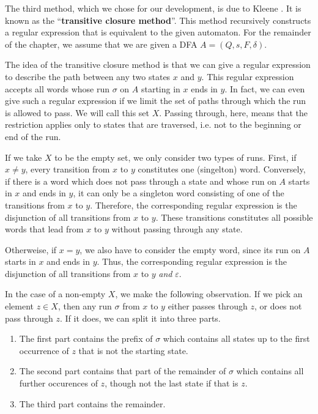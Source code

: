 The third method, which we chose for our development, is due to Kleene \cite{KleeneNets}.
It is known as the ``\textbf{transitive closure method}''.
This method recursively constructs a regular expression that is equivalent to the given automaton.
For the remainder of the chapter, we assume that we are given a DFA $A=(Q,s,F,\delta)$.


The idea of the transitive closure method is that we can give a regular expression to describe the path between any two states $x$ and $y$.
This regular expression accepts all words whose run $\sigma$ on $A$ starting in $x$ ends in $y$.
In fact, we can even give such a regular expression if we limit the set of paths through which the run is allowed to pass. 
We will call this set $X$.
Passing through, here, means that the restriction applies only to states that are traversed, 
i.e. not to the beginning or end of the run.


If we take $X$ to be the empty set, we only consider two types of runs.
First, if $x \neq y$, every transition from $x$ to $y$ constitutes one (singelton) word. 
Conversely, if there is a word which does not pass through a state and whose run on $A$ starts in $x$ and ends in $y$, 
it can only be a singleton word consisting of one of the transitions from $x$ to $y$.
Therefore, the corresponding regular expression is the disjunction of all transitions from $x$ to $y$. 
These transitions constitutes all possible words that lead from $x$ to $y$ without passing through any state.

Otherweise, if $x = y$, we also have to consider the empty word, since its run on $A$ starts in $x$ and ends in $y$.
Thus, the corresponding regular expression is the disjunction of all transitions from $x$ to $y$ \textit{and} $\varepsilon$.


In the case of a non-empty $X$, we make the following observation. 
If we pick an element $z \in X$, then any run $\sigma$ from $x$ to $y$ either passes through $z$, or does not pass through $z$.
If it does, we can split it into three parts.
\begin{enumerate}[label=(\roman*)]
    \item  \label{R_xz}
        The first part contains the prefix of $\sigma$ which contains all states up to the first occurrence of $z$ that is not the starting state.
    \item  \label{R_zz}
        The second part contains that part of the remainder of $\sigma$ which contains all further occurences of $z$, though not the last state if that is $z$.
    \item  \label{R_zy}
        The third part contains the remainder.
\end{enumerate}

